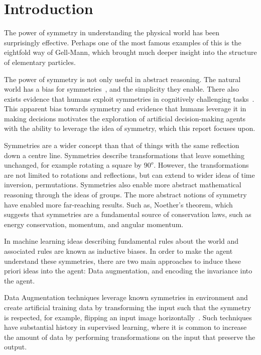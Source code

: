 \chapter{Introduction}\label{Chap1}
The power of symmetry in understanding the physical world has been surprisingly effective. Perhaps one of the most famous examples of this is the eightfold way of Gell-Mann\cite{gellmann1961eight}, which brought much deeper insight into the structure of elementary particles.

The power of symmetry is not only useful in abstract reasoning. The natural world has a bias for symmetries~\cite{johnston2022symmetry}, and the simplicity they enable. There also exists evidence that humans exploit symmetries in cognitively challenging tasks~\cite{he2022symmetry}. This apparent bias towards symmetry and evidence that humans leverage it in making decisions  motivates the exploration of artificial decision-making agents with the ability to leverage the idea of symmetry, which this report focuses upon.


Symmetries are a wider concept than that of things with the same reflection down a centre line. Symmetries describe transformations that leave something unchanged, for example rotating a square by $90^o$. However, the transformations are not limited to rotations and reflections, but can extend to wider ideas of time inversion, permutations. Symmetries also enable more abstract mathematical reasoning through the ideas of groups. The more abstract notions of symmetry have enabled more far-reaching results. Such as, Noether's theorem, which suggests that symmetries are a fundamental source of conservation laws, such as energy conservation, momentum, and angular momentum.

In machine learning ideas describing fundamental rules about the world and associated rules are known as inductive biases. In order to make the agent understand these symmetries, there are two main approaches to induce these priori ideas into the agent: Data augmentation, and encoding the invariance into the agent.

Data Augmentation techniques leverage known symmetries in environment and create artificial training data by transforming the input such that the symmetry is respected, for example, flipping an input image horizontally~\cite{laskin2020reinforcement, yijion2020invariant}. Such techniques have substantial history in supervised learning, where it is common to increase the amount of data by performing transformations on the input that preserve the output.

